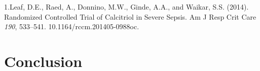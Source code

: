 \documentclass[
  a4paper,
  DIV=11,
  numbers=noendperiod,
  listof=totoc]{scrreprt}
\begin{document}
1.Leaf, D.E., Raed, A., Donnino, M.W., Ginde, A.A., and Waikar, S.S.
(2014). Randomized Controlled Trial of Calcitriol in Severe Sepsis. Am J
Resp Crit Care \emph{190}, 533--541. 10.1164/rccm.201405-0988oc.

\newpage{}

\hypertarget{conclusion}{%
\chapter{Conclusion}\label{conclusion}}

\newpage{}


\singlespace  \printbibliography[title=\centering Bibliographie]


\printbibliography
\end{document}
